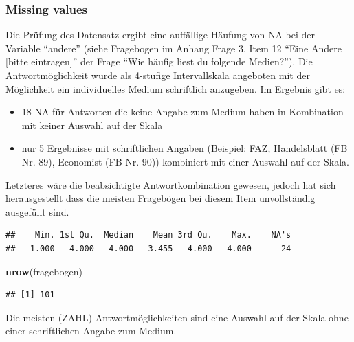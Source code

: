 \documentclass[]{article}
\newenvironment{Shaded}{\begin{snugshade}}{\end{snugshade}}
\newcommand{\KeywordTok}[1]{\textcolor[rgb]{0.13,0.29,0.53}{\textbf{{#1}}}}
\newcommand{\NormalTok}[1]{{#1}}
\providecommand{\tightlist}{%
  \setlength{\itemsep}{0pt}\setlength{\parskip}{0pt}}
\begin{document}
\subsubsection{Missing values}\label{missing-values}

Die Prüfung des Datensatz ergibt eine auffällige Häufung von NA bei der
Variable ``andere'' (siehe Fragebogen im Anhang Frage 3, Item 12 ``Eine
Andere {[}bitte eintragen{]}'' der Frage ``Wie häufig liest du folgende
Medien?''). Die Antwortmöglichkeit wurde als 4-stufige Intervallskala
angeboten mit der Möglichkeit ein individuelles Medium schriftlich
anzugeben. Im Ergebnis gibt es:

\begin{itemize}
\tightlist
\item
  18 NA für Antworten die keine Angabe zum Medium haben in Kombination
  mit keiner Auswahl auf der Skala\\
\item
  nur 5 Ergebnisse mit schriftlichen Angaben (Beispiel: FAZ,
  Handelsblatt (FB Nr. 89), Economist (FB Nr. 90)) kombiniert mit einer
  Auswahl auf der Skala.
\end{itemize}

Letzteres wäre die beabsichtigte Antwortkombination gewesen, jedoch hat
sich herausgestellt dass die meisten Fragebögen bei diesem Item
unvollständig ausgefüllt sind.

\begin{Shaded}
\end{Shaded}

\begin{verbatim}
##    Min. 1st Qu.  Median    Mean 3rd Qu.    Max.    NA's 
##   1.000   4.000   4.000   3.455   4.000   4.000      24
\end{verbatim}

\begin{Shaded}
\begin{Highlighting}[]
\KeywordTok{nrow}\NormalTok{(fragebogen)}
\end{Highlighting}
\end{Shaded}

\begin{verbatim}
## [1] 101
\end{verbatim}

Die meisten (ZAHL) Antwortmöglichkeiten sind eine Auswahl auf der Skala
ohne einer schriftlichen Angabe zum Medium.
\end{document}
